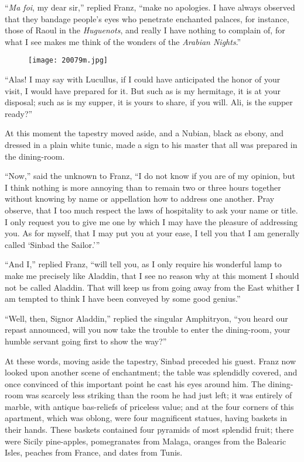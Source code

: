 “\textit{Ma foi}, my dear sir,” replied Franz, “make no apologies. I have
always observed that they bandage people’s eyes who penetrate enchanted
palaces, for instance, those of Raoul in the \textit{Huguenots}, and really I
have nothing to complain of, for what I see makes me think of the
wonders of the \textit{Arabian Nights}.”

\begin{figure}[h]
\texttt{[image: 20079m.jpg]}
\end{figure}

“Alas! I may say with Lucullus, if I could have anticipated the honor
of your visit, I would have prepared for it. But such as is my
hermitage, it is at your disposal; such as is my supper, it is yours to
share, if you will. Ali, is the supper ready?”

At this moment the tapestry moved aside, and a Nubian, black as ebony,
and dressed in a plain white tunic, made a sign to his master that all
was prepared in the dining-room.

“Now,” said the unknown to Franz, “I do not know if you are of my
opinion, but I think nothing is more annoying than to remain two or
three hours together without knowing by name or appellation how to
address one another. Pray observe, that I too much respect the laws of
hospitality to ask your name or title. I only request you to give me
one by which I may have the pleasure of addressing you. As for myself,
that I may put you at your ease, I tell you that I am generally called
‘Sinbad the Sailor.’”

“And I,” replied Franz, “will tell you, as I only require his wonderful
lamp to make me precisely like Aladdin, that I see no reason why at
this moment I should not be called Aladdin. That will keep us from
going away from the East whither I am tempted to think I have been
conveyed by some good genius.”

“Well, then, Signor Aladdin,” replied the singular Amphitryon, “you
heard our repast announced, will you now take the trouble to enter the
dining-room, your humble servant going first to show the way?”

At these words, moving aside the tapestry, Sinbad preceded his guest.
Franz now looked upon another scene of enchantment; the table was
splendidly covered, and once convinced of this important point he cast
his eyes around him. The dining-room was scarcely less striking than
the room he had just left; it was entirely of marble, with antique
bas-reliefs of priceless value; and at the four corners of this
apartment, which was oblong, were four magnificent statues, having
baskets in their hands. These baskets contained four pyramids of most
splendid fruit; there were Sicily pine-apples, pomegranates from
Malaga, oranges from the Balearic Isles, peaches from France, and dates
from Tunis.

